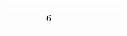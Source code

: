 \documentclass[12pt]{article}
\begin{document}
\begin{table}[]
{\begin{tabular}{clllllllllllllllllllllllllllllll}
\multicolumn{12}{|c|}{\cellcolor[HTML]{FFCCC9}}                                                                                                                                                                                                                                                                                      & \multicolumn{1}{l|}{} & \multicolumn{9}{l|}{\cellcolor[HTML]{FFCE93}}                                                                                                                                                                         & \multicolumn{10}{l|}{\cellcolor[HTML]{FFFC9E}}                                                                                                                                                                                                 \\ \cline{13-13}
\multicolumn{12}{|c|}{\multirow{-5}{*}{\cellcolor[HTML]{FFCCC9}6}}                                                                                                                                                                                                                                                                   & \multicolumn{1}{l|}{} & \multicolumn{9}{l|}{\cellcolor[HTML]{FFCE93}}                                                                                                                                                                         & \multicolumn{10}{l|}{\cellcolor[HTML]{FFFC9E}}                                                                                                                                                                                                 \\ \cline{1-13}
\multicolumn{4}{|c|}{\cellcolor[HTML]{FFCCC9}}                                                                                       & \multicolumn{1}{l|}{} & \multicolumn{1}{l|}{} & \multicolumn{1}{l|}{} & \multicolumn{1}{l|}{} & \multicolumn{1}{l|}{} & \multicolumn{1}{l|}{} & \multicolumn{1}{l|}{} & \multicolumn{1}{l|}{} & \multicolumn{1}{l|}{} & \multicolumn{9}{l|}{\cellcolor[HTML]{FFCE93}}                                                                                                                                                                         & \multicolumn{10}{l|}{\cellcolor[HTML]{FFFC9E}}                                                                                                                                                                                                 \\ \cline{5-13}

\end{tabular}}
\end{table}
\end{document}
